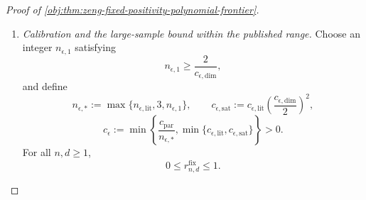 \begin{proof}[Proof of \cref{obj:thm:zeng-fixed-positivity-polynomial-frontier}]
\begin{enumerate}
Define the nearest-target test and its large-error events by
\[
\mathcal A_{\mathrm{test}}
:=
\left\{
\mathbf z:
|b_\kappa(\mathbf z)-\vartheta^{\mathrm{test}}_1|
\le
|b_\kappa(\mathbf z)-\vartheta^{\mathrm{test}}_0|
\right\},
\]
\[
\mathcal A_{\mathrm{bad},\iota}
:=
\left\{
\mathbf z:
|b_\kappa(\mathbf z)-\vartheta^{\mathrm{test}}_\iota|
\ge\frac{\delta_n}{2}
\right\},
\qquad \iota\in\{0,1\}.
\]
The triangle inequality gives
\[
\delta_n
=
|\vartheta^{\mathrm{test}}_1-\vartheta^{\mathrm{test}}_0|
\le
|b_\kappa-\vartheta^{\mathrm{test}}_0|
+
|b_\kappa-\vartheta^{\mathrm{test}}_1|.
\]
Consequently,
\[
\mathcal A_{\mathrm{test}}\subseteq\mathcal A_{\mathrm{bad},0},
\qquad
\mathcal A_{\mathrm{test}}^c\subseteq\mathcal A_{\mathrm{bad},1}.
\]
Applying the testing bound and then these inclusions yields
\[
c_{\mathrm{test}}
\le
Q^{\mathrm{test}}_1(\mathcal A_{\mathrm{bad},1})
+
Q^{\mathrm{test}}_0(\mathcal A_{\mathrm{bad},0}),
\]
and hence
\[
\frac{c_{\mathrm{test}}}{2}
\le
\max_{\iota\in\{0,1\}}
Q^{\mathrm{test}}_\iota(\mathcal A_{\mathrm{bad},\iota}).
\]
On each large-error event, squared loss is at least
\((\delta_n/2)^2\). Therefore
\[
\begin{split}
\frac{c_{\mathrm{test}}\delta_n^2}{8}
&\le
\left(\frac{\delta_n}{2}\right)^2
\max_{\iota\in\{0,1\}}
Q^{\mathrm{test}}_\iota(\mathcal A_{\mathrm{bad},\iota})\\
&\le
\max_{\iota\in\{0,1\}}
E_{Q^{\mathrm{test}}_\iota}
\left[
(b_\kappa-\vartheta^{\mathrm{test}}_\iota)^2
\right]\\
&\le
\max_{\iota\in\{0,1\}}
E_{P^{\mathrm{test}}_{Z,\iota}}
\left[
(\widehat\theta-\vartheta^{\mathrm{test}}_\iota)^2
\right].
\end{split}
\]
Both testing laws belong to the zero-control subclass, so taking the
minimax infimum gives
\[
\frac{c_{\mathrm{par}}}{n}
=
\frac{c_{\mathrm{test}}\delta_n^2}{8}
\le
\mathfrak R^{Z,0}_{n,d,\epsilon}
\le
\mathfrak R^Z_{n,d,\epsilon},
\qquad
c_{\mathrm{par}}:=\frac{c_{\mathrm{test}}}{128}>0.
\]

\item \textit{Calibration and the large-sample bound within the published range.}
Choose an integer \(n_{\epsilon,1}\) satisfying
\[
n_{\epsilon,1}\ge\frac2{c_{\epsilon,\mathrm{dim}}},
\]
and define
\[
n_{\epsilon,*}
:=
\max\{n_{\epsilon,\mathrm{lit}},3,n_{\epsilon,1}\},
\qquad
c_{\epsilon,\mathrm{sat}}
:=
c_{\epsilon,\mathrm{lit}}
\left(\frac{c_{\epsilon,\mathrm{dim}}}{2}\right)^2,
\]
\[
c_\epsilon
:=
\min\left\{
\frac{c_{\mathrm{par}}}{n_{\epsilon,*}},
\min\{c_{\epsilon,\mathrm{lit}},c_{\epsilon,\mathrm{sat}}\}
\right\}>0.
\]
For all \(n,d\ge1\),
\[
0\le r^{\mathrm{fix}}_{n,d}\le1.
\]


\end{enumerate}
\end{proof}

